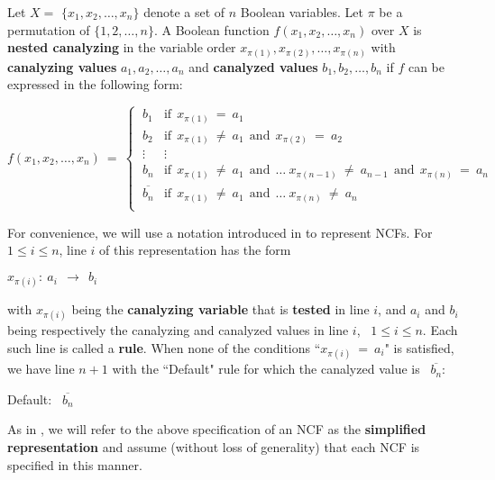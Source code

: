 \begin{definition}\label{def:nested_canalyzing}
Let $X = $ $\{x_1, x_2, \ldots, x_n\}$ denote a set of $n$  Boolean variables.
Let $\pi$ be a permutation of $\{1, 2, \ldots, n\}$.
A Boolean function $f(x_1, x_2, \ldots, x_n)$ over $X$ is \textbf{nested canalyzing}
in the variable order $x_{\pi(1)}, x_{\pi(2)}, \ldots, x_{\pi(n)}$ with
\textbf{canalyzing values} $a_1, a_2, \ldots, a_n$ and
\textbf{canalyzed values} $b_1, b_2, \ldots, b_n$
if $f$ can be expressed in the following form:

\medskip
\[
f(x_1, x_2, \ldots, x_n) ~=~ 
   \begin{cases}
       \:b_1 & \mathrm{if~~} x_{\pi(1)} ~=~ a_1 \\
       \:b_2 & \mathrm{if~~} x_{\pi(1)} ~\neq~ a_1 \mathrm{~~and~~}
            x_{\pi(2)} ~=~ a_2 \\
       \:\vdots & \vdots \\
       \:b_n & \mathrm{if~~} x_{\pi(1)} ~\neq~ a_1 \mathrm{~~and~~} \ldots~
             x_{\pi(n-1)} ~\neq~ a_{n-1} \mathrm{~~and~~} x_{\pi(n)} ~=~ a_n \\
       \:\overline{b_n} & \mathrm{if~~} x_{\pi(1)} ~\neq~ a_1 \mathrm{~~and~~} \ldots~
            x_{\pi(n)} ~\neq~ a_n \\
   \end{cases}
\]
\end{definition}

For convenience, we will use a notation introduced in \cite{Stearns-etal-2018}
to represent NCFs.
For $1 \leq i \leq n$, line $i$ of this representation has the form

\medskip

\noindent
\hspace*{1.1in} $x_{\pi(i)}:~ a_i ~~\longrightarrow~~ b_i$

\medskip

\noindent
with $x_{\pi(i)}$ being the \textbf{canalyzing variable} that is
\textbf{tested} in line $i$,
and $a_i$ and $b_i$ being respectively the canalyzing and
canalyzed values in line $i$,~ $1 \leq i \leq n$.
Each such line is called a \textbf{rule}.
When none of the conditions ``$x_{\pi(i)} ~=~ a_i$"
is satisfied, we have line $n+1$ with the ``Default" rule
for which the canalyzed value is~ $\overline{b_n}$:

\medskip

\noindent
\hspace*{1.1in} Default:~ $\overline{b_n}$

\medskip
\noindent
As in \cite{Stearns-etal-2018}, we will refer to the above specification
of an NCF as the \textbf{simplified representation} and assume
(without loss of generality) that each NCF is specified in this manner.

